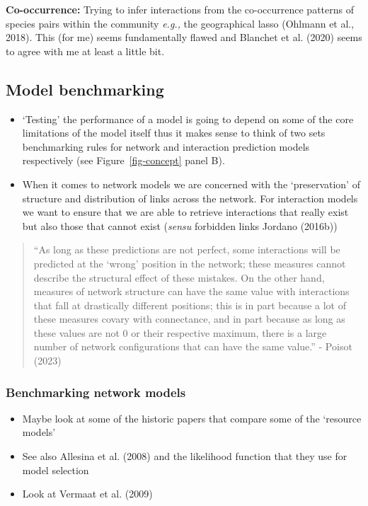 \documentclass[
]{agujournal2019}
\begin{document}
\textbf{Co-occurrence:} Trying to infer interactions from the
co-occurrence patterns of species pairs within the community
\emph{e.g.,} the geographical lasso (Ohlmann et al., 2018). This (for
me) seems fundamentally flawed and Blanchet et al. (2020) seems to agree
with me at least a little bit.

\subsection{Model benchmarking}\label{model-benchmarking}

\begin{itemize}
\item
  `Testing' the performance of a model is going to depend on some of the
  core limitations of the model itself thus it makes sense to think of
  two sets benchmarking rules for network and interaction prediction
  models respectively (see Figure~\ref{fig-concept} panel B).
\item
  When it comes to network models we are concerned with the
  `preservation' of structure and distribution of links across the
  network. For interaction models we want to ensure that we are able to
  retrieve interactions that really exist but also those that cannot
  exist (\emph{sensu} forbidden links Jordano (2016b))
\end{itemize}

\begin{quote}
``As long as these predictions are not perfect, some interactions will
be predicted at the `wrong' position in the network; these measures
cannot describe the structural effect of these mistakes. On the other
hand, measures of network structure can have the same value with
interactions that fall at drastically different positions; this is in
part because a lot of these measures covary with connectance, and in
part because as long as these values are not 0 or their respective
maximum, there is a large number of network configurations that can have
the same value.'' - Poisot (2023)
\end{quote}

\subsubsection{Benchmarking network
models}\label{benchmarking-network-models}

\begin{itemize}
\item
  Maybe look at some of the historic papers that compare some of the
  `resource models'
\item
  See also Allesina et al. (2008) and the likelihood function that they
  use for model selection
\item
  Look at Vermaat et al. (2009)
\end{itemize}
\end{document}
